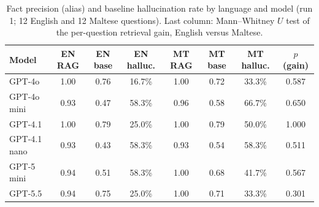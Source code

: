 \begin{table}[H]
\centering
\caption{Fact precision (alias) and baseline hallucination rate by language and model (run 1; 12 English and 12 Maltese questions). Last column: Mann--Whitney $U$ test of the per-question retrieval gain, English versus Maltese.}
\label{tab:bylang}
{\footnotesize{}\setlength{\tabcolsep}{4pt}
\begin{tabular}{lccccccc}
\toprule
\textbf{Model} & \textbf{EN RAG} & \textbf{EN base} & \textbf{EN halluc.} & \textbf{MT RAG} & \textbf{MT base} & \textbf{MT halluc.} & \textbf{$p$ (gain)} \\
\midrule
GPT-4o & 1.00 & 0.76 & 16.7\% & 1.00 & 0.72 & 33.3\% & 0.587 \\
GPT-4o mini & 0.93 & 0.47 & 58.3\% & 0.96 & 0.58 & 66.7\% & 0.650 \\
GPT-4.1 & 1.00 & 0.79 & 25.0\% & 1.00 & 0.79 & 50.0\% & 1.000 \\
GPT-4.1 nano & 0.93 & 0.43 & 58.3\% & 0.93 & 0.54 & 58.3\% & 0.511 \\
GPT-5 mini & 0.94 & 0.51 & 58.3\% & 1.00 & 0.68 & 41.7\% & 0.567 \\
GPT-5.5 & 0.94 & 0.75 & 25.0\% & 1.00 & 0.71 & 33.3\% & 0.301 \\
\bottomrule
\end{tabular}
}
\end{table}
